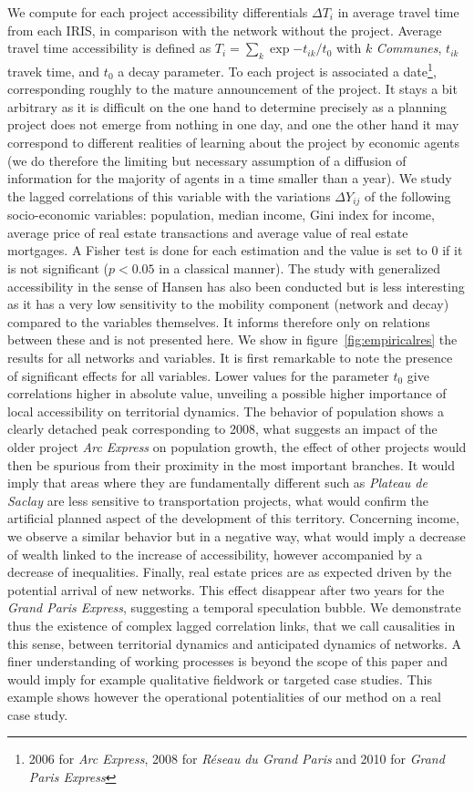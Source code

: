 \documentclass[english]{./sageo}
\begin{document}
We compute for each project accessibility differentials $\Delta T_i$ in average travel time from each IRIS, in comparison with the network without the project. Average travel time accessibility is defined as $T_i = \sum_k \exp{-t_{ik}/t_0}$ with $k$ \emph{Communes}, $t_{ik}$ travek time, and $t_0$ a decay parameter. To each project is associated a date\footnote{2006 for \emph{Arc Express}, 2008 for \emph{Réseau du Grand Paris} and 2010 for \emph{Grand Paris Express}}, corresponding roughly to the mature announcement of the project. It stays a bit arbitrary as it is difficult on the one hand to determine precisely as a planning project does not emerge from nothing in one day, and one the other hand it may correspond to different realities of learning about the project by economic agents (we do therefore the limiting but necessary assumption of a diffusion of information for the majority of agents in a time smaller than a year). We study the lagged correlations of this variable with the variations $\Delta Y_{ij}$ of the following socio-economic variables: population, median income, Gini index for income, average price of real estate transactions and average value of real estate mortgages. A Fisher test is done for each estimation and the value is set to 0 if it is not significant ($p<0.05$ in a classical manner). The study with generalized accessibility in the sense of Hansen has also been conducted but is less interesting as it has a very low sensitivity to the mobility component (network and decay) compared to the variables themselves. It informs therefore only on relations between these and is not presented here. We show in figure~\ref{fig:empiricalres} the results for all networks and variables. It is first remarkable to note the presence of significant effects for all variables. Lower values for the parameter $t_0$ give correlations higher in absolute value, unveiling a possible higher importance of local accessibility on territorial dynamics. The behavior of population shows a clearly detached peak corresponding to 2008, what suggests an impact of the older project \emph{Arc Express} on population growth, the effect of other projects would then be spurious from their proximity in the most important branches. It would imply that areas where they are fundamentally different such as \emph{Plateau de Saclay} are less sensitive to transportation projects, what would confirm the artificial planned aspect of the development of this territory. Concerning income, we observe a similar behavior but in a negative way, what would imply a decrease of wealth linked to the increase of accessibility, however accompanied by a decrease of inequalities. Finally, real estate prices are as expected driven by the potential arrival of new networks. This effect disappear after two years for the \emph{Grand Paris Express}, suggesting a temporal speculation bubble. We demonstrate thus the existence of complex lagged correlation links, that we call causalities in this sense, between territorial dynamics and anticipated dynamics of networks. A finer understanding of working processes is beyond the scope of this paper and would imply for example qualitative fieldwork or targeted case studies. This example shows however the operational potentialities of our method on a real case study.
\end{document}
